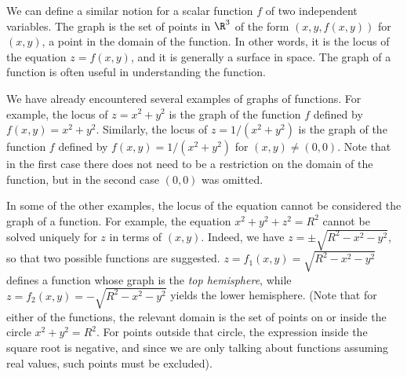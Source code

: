 We can define a similar notion for a scalar function $f$ of two
independent variables.  The graph is the
set of points in $\R^3$  of the form $(x, y, f(x,y))$
for $(x,y)$, a point in the domain of the function.  In other words,
it is the locus of the equation $z = f(x,y)$, and it is generally
a surface in space.
The graph of a function is often useful in understanding the
function.

We have already encountered several examples of graphs of functions.
For example, the locus of $z = x^2 + y^2$ is the graph of the
function $f$ defined by $f(x,y) = x^2 +y^2$.   Similarly, the locus
of $z = 1/(x^2 + y^2)$ is the graph of the function $f$ defined by
$f(x,y) = 1/(x^2 + y^2)$ for $(x,y) \not= (0,0)$. 
  Note that in the first case there does not need to be a restriction on the domain of the function, but in the second
case $(0,0)$ was omitted.  

In some of the other examples, the locus
of the equation cannot be considered the graph of a function.
For example, the equation $x^2 + y^2 + z^2 = R^2$ cannot be solved
uniquely for $z$ in terms of $(x,y)$.  Indeed, we have
$z = \pm\sqrt{R^2 - x^2 - y^2}$, so that two possible functions
are suggested.  $z = f_1(x,y) = \sqrt{R^2 - x^2 - y^2}$ 
defines a function whose graph is
the \emph{top hemisphere}, while $z = f_2(x,y)
= - \sqrt{R^2 - x^2 - y^2}$ yields the lower hemisphere.  (Note that
for either of the functions, the relevant domain is the set of
points on or inside the circle $x^2 + y^2 = R^2$.  For points outside
that circle, the expression inside the square root is negative, and
since we are only talking about functions assuming real values,
such points must be excluded).

